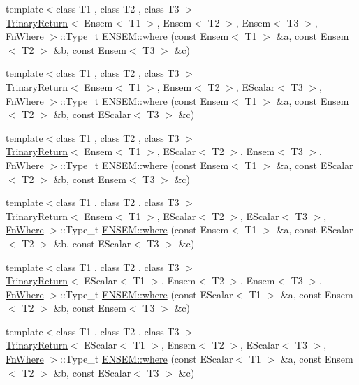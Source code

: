 \begin{DoxyCompactItemize}
\item 
{\footnotesize template$<$class T1 , class T2 , class T3 $>$ }\\\mbox{\hyperlink{structTrinaryReturn}{Trinary\+Return}}$<$ Ensem$<$ T1 $>$, Ensem$<$ T2 $>$, Ensem$<$ T3 $>$, \mbox{\hyperlink{structFnWhere}{Fn\+Where}} $>$\+::Type\+\_\+t \mbox{\hyperlink{group__eensem_gac55277f43f9b655a1ae7d4599568d633}{E\+N\+S\+E\+M\+::where}} (const Ensem$<$ T1 $>$ \&a, const Ensem$<$ T2 $>$ \&b, const Ensem$<$ T3 $>$ \&c)
\item 
{\footnotesize template$<$class T1 , class T2 , class T3 $>$ }\\\mbox{\hyperlink{structTrinaryReturn}{Trinary\+Return}}$<$ Ensem$<$ T1 $>$, Ensem$<$ T2 $>$, E\+Scalar$<$ T3 $>$, \mbox{\hyperlink{structFnWhere}{Fn\+Where}} $>$\+::Type\+\_\+t \mbox{\hyperlink{group__eensem_ga954917c149f91e175980e8359b2e02a2}{E\+N\+S\+E\+M\+::where}} (const Ensem$<$ T1 $>$ \&a, const Ensem$<$ T2 $>$ \&b, const E\+Scalar$<$ T3 $>$ \&c)
\item 
{\footnotesize template$<$class T1 , class T2 , class T3 $>$ }\\\mbox{\hyperlink{structTrinaryReturn}{Trinary\+Return}}$<$ Ensem$<$ T1 $>$, E\+Scalar$<$ T2 $>$, Ensem$<$ T3 $>$, \mbox{\hyperlink{structFnWhere}{Fn\+Where}} $>$\+::Type\+\_\+t \mbox{\hyperlink{group__eensem_ga8e810f6bd36674024a877b4ff879c3fe}{E\+N\+S\+E\+M\+::where}} (const Ensem$<$ T1 $>$ \&a, const E\+Scalar$<$ T2 $>$ \&b, const Ensem$<$ T3 $>$ \&c)
\item 
{\footnotesize template$<$class T1 , class T2 , class T3 $>$ }\\\mbox{\hyperlink{structTrinaryReturn}{Trinary\+Return}}$<$ Ensem$<$ T1 $>$, E\+Scalar$<$ T2 $>$, E\+Scalar$<$ T3 $>$, \mbox{\hyperlink{structFnWhere}{Fn\+Where}} $>$\+::Type\+\_\+t \mbox{\hyperlink{group__eensem_ga16076c28e8993bb0aad6e627a1f0b018}{E\+N\+S\+E\+M\+::where}} (const Ensem$<$ T1 $>$ \&a, const E\+Scalar$<$ T2 $>$ \&b, const E\+Scalar$<$ T3 $>$ \&c)
\item 
{\footnotesize template$<$class T1 , class T2 , class T3 $>$ }\\\mbox{\hyperlink{structTrinaryReturn}{Trinary\+Return}}$<$ E\+Scalar$<$ T1 $>$, Ensem$<$ T2 $>$, Ensem$<$ T3 $>$, \mbox{\hyperlink{structFnWhere}{Fn\+Where}} $>$\+::Type\+\_\+t \mbox{\hyperlink{group__eensem_ga25b89d44a0521a8e9be1de7b1e8010b8}{E\+N\+S\+E\+M\+::where}} (const E\+Scalar$<$ T1 $>$ \&a, const Ensem$<$ T2 $>$ \&b, const Ensem$<$ T3 $>$ \&c)
\item 
{\footnotesize template$<$class T1 , class T2 , class T3 $>$ }\\\mbox{\hyperlink{structTrinaryReturn}{Trinary\+Return}}$<$ E\+Scalar$<$ T1 $>$, Ensem$<$ T2 $>$, E\+Scalar$<$ T3 $>$, \mbox{\hyperlink{structFnWhere}{Fn\+Where}} $>$\+::Type\+\_\+t \mbox{\hyperlink{group__eensem_gaa4e0f13f6f2d07520289a95c6290a38b}{E\+N\+S\+E\+M\+::where}} (const E\+Scalar$<$ T1 $>$ \&a, const Ensem$<$ T2 $>$ \&b, const E\+Scalar$<$ T3 $>$ \&c)

\end{DoxyCompactItemize}

